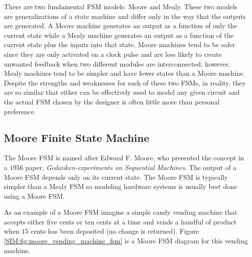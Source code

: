 There are two fundamental \ac{FSM} models: Moore and Mealy. These two models are generalizations of a state machine and differ only in the way that the outputs are generated. A Moore machine generates an output as a function of only the current state while a Mealy machine generates an output as a function of the current state plus the inputs into that state. Moore machines tend to be safer since they are only activated on a clock pulse and are less likely to create unwanted feedback when two different modules are interconnected; however, Mealy machines tend to be simpler and have fewer states than a Moore machine. Despite the strengths and weaknesses for each of these two \acp{FSM}, in reality, they are so similar that either can be effectively used to model any given circuit and the actual \ac{FSM} chosen by the designer is often little more than personal preference. 

\subsection{Moore Finite State Machine}
\label{SIM:subsec:moore_finite_state_machine}

The Moore \ac{FSM} is named after Edward F. Moore, who presented the concept in a $ 1956 $ paper, \emph{Gedanken-experiments on Sequential Machines}. The output of a Moore \ac{FSM} depends only on its current state. The Moore \ac{FSM} is typically simpler than a Mealy \ac{FSM} so modeling hardware systems is usually best done using a Moore \ac{FSM}. 

As an example of a Moore \ac{FSM} imagine a simple candy vending machine that accepts either five cents or ten cents at a time and vends a handful of product when $ 15 $ cents has been deposited (no change is returned). Figure \ref{SIM:fig:moore_vending_machine_fsm} is a Moore \ac{FSM} diagram for this vending machine.

